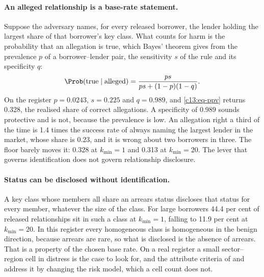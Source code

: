 \paragraph{An alleged relationship is a base-rate statement.} Suppose the adversary
names, for every released borrower, the lender holding the largest share of that
borrower's key class. What counts for harm is the probability that an allegation is
true, which Bayes' theorem gives from the prevalence $p$ of a borrower--lender pair,
the sensitivity $s$ of the rule and its specificity $q$:
\begin{equation}\label{c13:eq-ppv}
\Prob(\text{true} \mid \text{alleged}) = \frac{ps}{ps + (1-p)(1-q)} .
\end{equation}
On the register $p = 0.0243$, $s = 0.225$ and $q = 0.989$, and
\eqref{c13:eq-ppv} returns 0.328, the realised share of correct allegations.
A specificity of 0.989 sounds protective and is not, because the prevalence is low.
An allegation right a third of the time is 1.4 times the success rate of always
naming the largest lender in the market, whose share is 0.23, and it is wrong about
two borrowers in three. The floor barely moves it: 0.328 at $k_{\min}=1$ and 0.313
at $k_{\min}=20$.
The lever that governs identification does not govern relationship disclosure.

\paragraph{Status can be disclosed without identification.} A key class whose members
all share an arrears status discloses that status for every member, whatever the
size of the class. For large borrowers 44.4 per cent of released relationships sit in
such a class at $k_{\min}=1$, falling to 11.9 per cent at $k_{\min}=20$.
In this register every homogeneous class is homogeneous in the benign direction,
because arrears are rare, so what is disclosed is the absence of arrears. That is a
property of the chosen base rate. On a real register a small sector--region cell in
distress is the case to look for, and the attribute criteria of
\citet{machanavajjhala2007} and \citet{li2007} address it by changing the risk model,
which a cell count does not.

